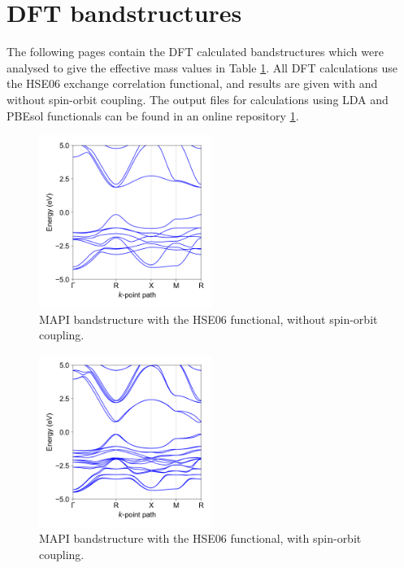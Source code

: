 \chapter{\label{app:2-bandstructures}DFT bandstructures}

The following pages contain the DFT calculated bandstructures which were analysed to give the effective mass values in Table \ref{}. All DFT calculations use the HSE06 exchange correlation functional, and results  are given with and without spin-orbit coupling. The output files for calculations using LDA and PBEsol functionals can be found in an online repository \ref{}.

\clearpage

\begin{figure}[htb]
\includegraphics[width=0.5\textwidth]{./figures/ap2/MAPI_hybrid.png}
\caption[MAPI bandstructure, HSE06, no-SoC]{MAPI bandstructure with the HSE06 functional, without spin-orbit coupling. }
\end{figure}

\begin{figure}[htb]
\includegraphics[width=0.5\textwidth]{./figures/ap2/MAPI_hybrid_SoC.png}
\caption[MAPI bandstructure, HSE06, SoC]{MAPI bandstructure with the HSE06 functional, with spin-orbit coupling. }
\end{figure}

